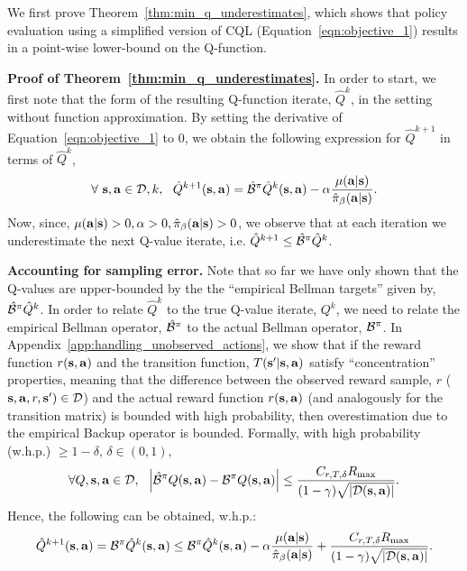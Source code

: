 We first prove Theorem~\ref{thm:min_q_underestimates}, which shows that policy evaluation using a simplified version of CQL (Equation~\ref{eqn:objective_1}) results in a point-wise lower-bound on the Q-function. 

\textbf{Proof of Theorem~\ref{thm:min_q_underestimates}.} In order to start, we first note that the form of the resulting Q-function iterate, $\hat{Q}^k$, in the setting without function approximation. By setting the derivative of Equation~\ref{eqn:objective_1} to 0, we obtain the following expression for $\hat{Q}^{k+1}$ in terms of $\hat{Q}^k$,
\begin{equation}
    \forall~\mathbf{s}, \mathbf{a} \in \mathcal{D}, k, ~~ \hat{Q}^{k+1}(\mathbf{s}, \mathbf{a}) = \hat{\mathcal{B}}^\pi \hat{Q}^k(\mathbf{s}, \mathbf{a}) - \alpha \frac{\mu(\mathbf{a}|\mathbf{s})}{\hat{\pi}_\beta(\mathbf{a}|\mathbf{s})}.
    \label{eqn:q_expression_objective1}
\end{equation}
Now, since, $\mu(\mathbf{a}|\mathbf{s}) > 0, \alpha > 0, \hat{\pi}_\beta(\mathbf{a}|\mathbf{s}) > 0$, we observe that at each iteration we underestimate the next Q-value iterate, i.e. $\hat{Q}^{k+1} \leq \hat{\mathcal{B}}^\pi \hat{Q}^k$.

\textbf{Accounting for sampling error.} Note that so far we have only shown that the Q-values are upper-bounded by the the ``empirical Bellman targets'' given by, $\hat{\mathcal{B}}^\pi \hat{Q}^k$. In order to relate $\hat{Q}^k$ to the true Q-value iterate, $Q^k$, we need to relate the empirical Bellman operator, $\hat{\mathcal{B}}^\pi$ to the actual Bellman operator, $\mathcal{B}^\pi$. In Appendix~\ref{app:handling_unobserved_actions}, we show that if the reward function $r(\mathbf{s}, \mathbf{a})$ and the transition function, $T(\mathbf{s}'|\mathbf{s}, \mathbf{a})$ satisfy ``concentration'' properties, meaning that the difference between the observed reward sample, $r$ ($\mathbf{s}, \mathbf{a}, r, \mathbf{s}') \in \mathcal{D}$) and the actual reward function $r(\mathbf{s}, \mathbf{a})$ (and analogously for the transition matrix) is bounded with high probability, then overestimation due to the empirical Backup operator is bounded. Formally, with high probability (w.h.p.) $\geq 1 - \delta$, $\delta \in (0, 1)$, 
\begin{equation*}
    \forall Q, \mathbf{s}, \mathbf{a} \in \mathcal{D},~~ \left\vert \hat{\mathcal{B}}^\pi Q(\mathbf{s}, \mathbf{a}) - \mathcal{B}^\pi Q(\mathbf{s}, \mathbf{a}) \right\vert \leq \frac{C_{r, T, \delta} R_{\max}}{(1 - \gamma) \sqrt{|\mathcal{D}(\mathbf{s}, \mathbf{a})|}}.
\end{equation*}
Hence, the following can be obtained, w.h.p.:
\begin{align}
\label{eqn:pac_bound_q_value}
    \hat{Q}^{k+1}(\mathbf{s}, \mathbf{a}) = \mathcal{B}^\pi \hat{Q}^k(\mathbf{s}, \mathbf{a}) \leq \mathcal{B}^\pi \hat{Q}^k(\mathbf{s}, \mathbf{a}) - \alpha \frac{\mu(\mathbf{a}|\mathbf{s})}{\hat{\pi}_\beta(\mathbf{a}|\mathbf{s})} + \frac{C_{r, T, \delta} R_{\max}}{(1 - \gamma) \sqrt{|\mathcal{D}(\mathbf{s}, \mathbf{a})|}}.
\end{align}

